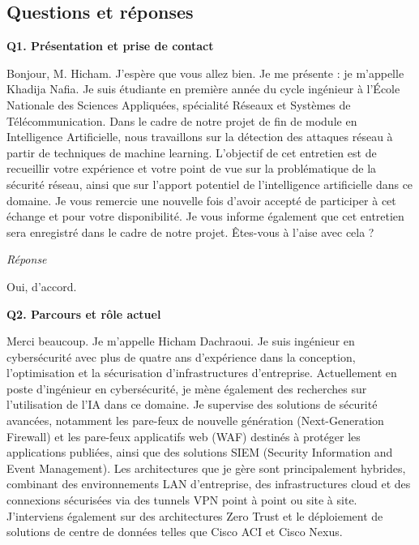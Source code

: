 \documentclass[12pt,a4paper]{article}
\begin{document}
\subsection*{Questions et r\'{e}ponses}

\textbf{Q1. Pr\'{e}sentation et prise de contact}

Bonjour, M. Hicham. J'esp\`{e}re que vous allez bien. Je me pr\'{e}sente : je m'appelle Khadija Nafia.
Je suis \'{e}tudiante en premi\`{e}re ann\'{e}e du cycle ing\'{e}nieur \`{a} l'\'{E}cole Nationale des Sciences
Appliqu\'{e}es, sp\'{e}cialit\'{e} R\'{e}seaux et Syst\`{e}mes de T\'{e}l\'{e}communication. Dans le cadre de notre
projet de fin de module en Intelligence Artificielle, nous travaillons sur la d\'{e}tection des attaques
r\'{e}seau \`{a} partir de techniques de machine learning. L'objectif de cet entretien est de recueillir
votre exp\'{e}rience et votre point de vue sur la probl\'{e}matique de la s\'{e}curit\'{e} r\'{e}seau, ainsi que
sur l'apport potentiel de l'intelligence artificielle dans ce domaine. Je vous remercie une nouvelle
fois d'avoir accept\'{e} de participer \`{a} cet \'{e}change et pour votre disponibilit\'{e}. Je vous informe
\'{e}galement que cet entretien sera enregistr\'{e} dans le cadre de notre projet. \^{E}tes-vous \`{a} l'aise
avec cela ?

\medskip
\textit{R\'{e}ponse}

Oui, d'accord.

\bigskip
\textbf{Q2. Parcours et r\^{o}le actuel}

Merci beaucoup. Je m'appelle Hicham Dachraoui. Je suis ing\'{e}nieur en cybers\'{e}curit\'{e} avec plus
de quatre ans d'exp\'{e}rience dans la conception, l'optimisation et la s\'{e}curisation d'infrastructures
d'entreprise. Actuellement en poste d'ing\'{e}nieur en cybers\'{e}curit\'{e}, je m\`{e}ne \'{e}galement des
recherches sur l'utilisation de l'IA dans ce domaine. Je supervise des solutions de s\'{e}curit\'{e}
avanc\'{e}es, notamment les pare-feux de nouvelle g\'{e}n\'{e}ration (Next-Generation Firewall) et les
pare-feux applicatifs web (WAF) destin\'{e}s \`{a} prot\'{e}ger les applications publi\'{e}es, ainsi que des
solutions SIEM (Security Information and Event Management). Les architectures que je g\`{e}re sont
principalement hybrides, combinant des environnements LAN d'entreprise, des infrastructures
cloud et des connexions s\'{e}curis\'{e}es via des tunnels VPN point \`{a} point ou site \`{a} site.
J'interviens \'{e}galement sur des architectures Zero Trust et le d\'{e}ploiement de solutions de centre
de donn\'{e}es telles que Cisco ACI et Cisco Nexus.
\end{document}
